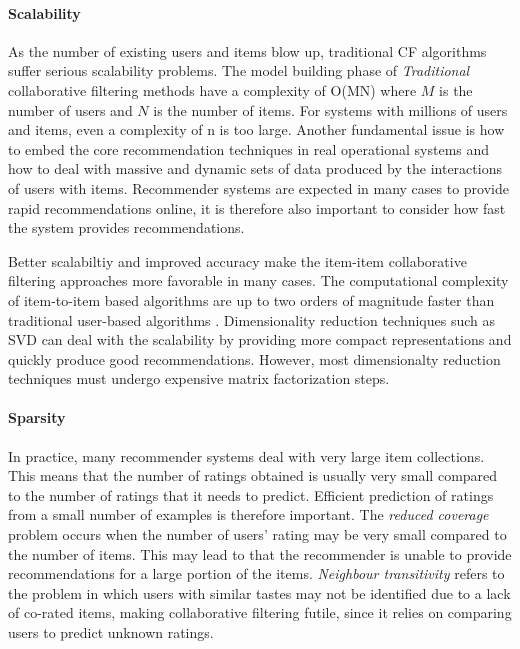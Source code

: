 \paragraph{Scalability}

As the number of existing users and items blow up, traditional CF algorithms
suffer serious scalability problems. The model building phase of
\emph{Traditional} collaborative filtering methods have a complexity of O(MN)
where $M$ is the number of users and $N$ is the number of items. For systems
with millions of users and items, even a complexity of n is too large. Another
fundamental issue is how to embed the core recommendation techniques in real
operational systems and how to deal with massive and dynamic sets of data
produced by the interactions of users with items. Recommender systems are
expected in many cases to provide rapid recommendations online, it is therefore
also important to consider how fast the system provides recommendations.

Better scalabiltiy and improved accuracy make the item-item collaborative
filtering approaches more favorable in many cases. The computational complexity
of item-to-item based algorithms are up to two orders of magnitude faster than
traditional user-based algorithms \cite{Deshpande2004}. Dimensionality
reduction techniques such as SVD can deal with the scalability by providing
more compact representations and quickly produce good recommendations. However,
most dimensionalty reduction techniques must undergo expensive matrix
factorization steps.\newline

\paragraph{Sparsity}

In practice, many recommender systems deal with very large item collections.
This means that the number of ratings obtained is usually very small compared
to the number of ratings that it needs to predict. Efficient prediction of
ratings from a small number of examples is therefore important. The
\emph{reduced coverage} problem occurs when the number of users' rating may be
very small compared to the number of items. This may lead to that the
recommender is unable to provide recommendations for a large portion of the
items. \emph{Neighbour transitivity} refers to the problem in which users with
similar tastes may not be identified due to a lack of co-rated items, making
collaborative filtering futile, since it relies on comparing users to predict
unknown ratings.

